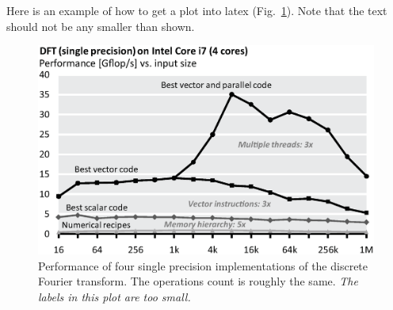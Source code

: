 \documentclass[letterpaper]{article}
\begin{document}
Here is an example of how to get a plot into latex
(Fig.~\ref{fftperf}). Note that the text should not be any smaller than shown.

\begin{figure}\centering
  \includegraphics[scale=0.33]{dft-performance.eps}
  \caption{Performance of four single precision implementations of the
  discrete Fourier transform. The operations count is roughly the
  same. {\em The labels in this plot are too small.}\label{fftperf}}
\end{figure}





\end{document}

